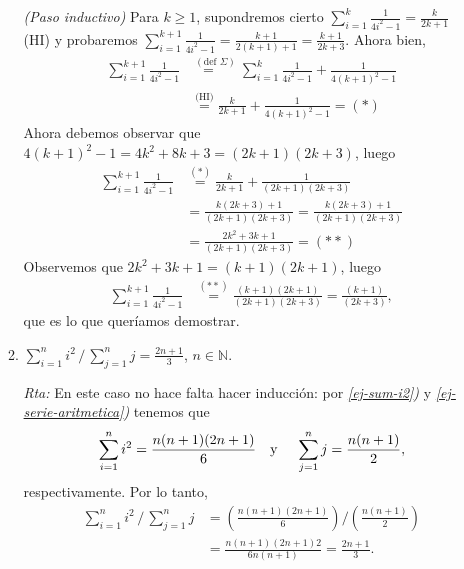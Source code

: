 \documentclass[a4paper,12pt,twoside,spanish,reqno]{amsbook}
\numberwithin{equation}{section}
\newcommand{\rta}{\noindent\textit{Rta: }}
\begin{document}
\begin{enumerate}[resume]
\begin{enumerate}
                \textit{(Paso inductivo) }  Para  $k \ge 1$,  supondremos cierto $\sum_{i=1}^k \frac{1}{4i^2-1} = \frac{k}{2k+1}$ (HI) y probaremos $\sum_{i=1}^{k+1} \frac{1}{4i^2-1} = \frac{k+1}{2(k+1)+1} = \frac{k+1}{2k+3}$. Ahora bien,
                \begin{align*}
                \sum_{i=1}^{k+1} \frac{1}{4i^2-1} &\overset{(\text{def } \Sigma)}{=\quad}\sum_{i=1}^{k} \frac{1}{4i^2-1} +  \frac{1}{4(k+1)^2-1}\\
                &\overset{\text{(HI)}}{=} \frac{k}{2k+1} + \frac{1}{4(k+1)^2-1} = (*)
                \end{align*}
                Ahora debemos observar que $4(k+1)^2-1 = 4k^2 +8k+3 = (2k+1)(2k+3)$, luego
                \begin{align*}
                \sum_{i=1}^{k+1} \frac{1}{4i^2-1} &\overset{(*)}{=} \frac{k}{2k+1} + \frac{1}{(2k+1)(2k+3)} \\
                &=  \frac{k(2k+3) +1}{(2k+1)(2k+3)} = \frac{k(2k+3) +1}{(2k+1)(2k+3)} \\
                &=  \frac{2k^2+3k +1}{(2k+1)(2k+3)}  = (**)
                \end{align*}
                Observemos  que $2k^2+3k +1 = (k+1)(2k+1)$, luego
                \begin{align*}
                \sum_{i=1}^{k+1} \frac{1}{4i^2-1} &\overset{(**)}{=} \frac{(k+1)(2k+1)}{(2k+1)(2k+3)} = \frac{(k+1)}{(2k+3)},
                \end{align*}
                que es lo que queríamos demostrar.
                
                \item $\displaystyle{ \sum_{i=1}^n i^2\, /\, \sum_{j=1}^n j = \frac{2n+1}{3}}$, $n\in \mathbb N$.
                
                \rta En  este caso no hace falta hacer inducción: por \textit{ \ref{ej-sum-i2})} y \textit{\ref{ej-serie-aritmetica})} tenemos que 
                \begin{equation*}
                    \sum_{i=1}^n i^2 = \frac{n(n+1)(2n+1)}{6} \text{\quad y \quad} \sum_{j=1}^n j = \frac{n(n+1)}{2},
                \end{equation*}
                respectivamente. Por  lo tanto, 
                \begin{align*}
                    \sum_{i=1}^n i^2\, /\, \sum_{j=1}^n j &= \left(\frac{n(n+1)(2n+1)}{6}\right) / \left(\frac{n(n+1)}{2}\right) \\
                    &= \frac{n(n+1)(2n+1)2}{6n(n+1)} = \frac{2n+1}{3}.
                \end{align*}
                

\end{enumerate}
\end{enumerate}
\end{document}
